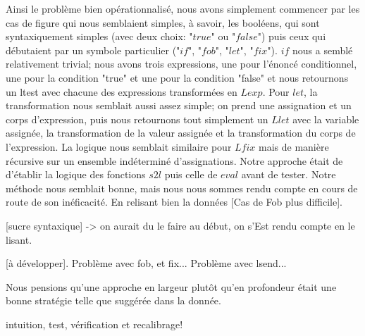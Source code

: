 \documentclass{article}
\begin{document}
	Ainsi le problème bien opérationnalisé, nous avons simplement commencer par
	les cas de figure qui nous semblaient simples, à savoir, les booléens, qui sont
	syntaxiquement simples (avec deux choix: "$true$" ou "$false$") puis ceux qui
	débutaient par un symbole particulier ("$if$", "$fob$", "$let$", "$fix$").
	$if$ nous a semblé relativement trivial; nous avons trois expressions, une
	pour l'énoncé conditionnel, une pour la condition "true" et une pour la condition
	"false" et nous retournons un ltest avec chacune des expressions transformées en
	$Lexp$. Pour $let$, la transformation nous semblait aussi assez simple; on
	prend une assignation et un corps d'expression, puis nous retournons tout simplement
	un $Llet$ avec la variable assignée, la transformation de la valeur assignée
	et la transformation du corps de l'expression. La logique nous semblait similaire
	pour $Lfix$ mais de manière récursive sur un ensemble indéterminé d'assignations.
	Notre approche était de d'établir la logique des fonctions $s2l$ puis celle de
	$eval$ avant de tester. Notre méthode nous semblait bonne, mais nous nous
	sommes rendu compte en cours de route de son inéficacité. En relisant bien la données
	[Cas de Fob plus difficile].

	[sucre syntaxique] -> on aurait du le faire au début, on s'Est rendu compte en
	le lisant.

	[à développer]. Problème avec fob, et fix... Problème avec lsend...

	Nous pensions qu'une approche en largeur plutôt qu'en profondeur était une
	bonne stratégie telle que suggérée dans la donnée.

	intuition, test, vérification et recalibrage!
\end{document}

